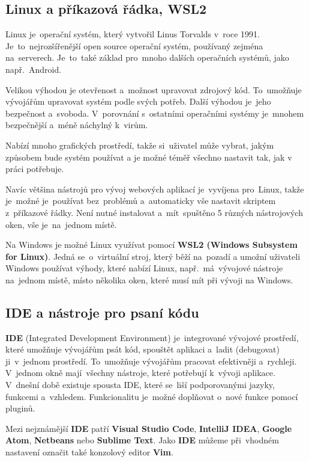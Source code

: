 \documentclass[14pt,a4paper]{article}
\begin{document}
        \subsection{Linux a příkazová řádka, WSL2}
        Linux je~operační systém, který vytvořil Linus Torvalds v~roce 1991. Je~to~nejrozšířenější open source operační systém,
        používaný zejména na~serverech. Je~to~také základ pro~mnoho dalších operačních systémů, jako např.~Android.
        
        Velikou výhodou je otevřenost a~možnost upravovat zdrojový kód. To~umožňuje vývojářům upravovat systém podle svých potřeb.
        Další výhodou je~jeho bezpečnost a~svoboda. V~porovnání s~ostatními operačními systémy je~mnohem bezpečnější a~méně náchylný k~virům.

        Nabízí mnoho grafických prostředí, takže si~uživatel může vybrat, jakým způsobem bude systém používat a je možné téměř
        všechno nastavit tak, jak v práci potřebuje.

        Navíc většina nástrojů pro vývoj webových aplikací je~vyvíjena pro~Linux, takže je~možné je~používat bez~problémů a~automaticky vše nastavit skriptem z~příkazové řádky. Není nutné instalovat a~mít~spuštěno 5 různých nástrojových oken, vše je~na~jednom místě.

        Na Windows je možné Linux využívat pomocí \textbf{WSL2 (Windows Subsystem for Linux)}. Jedná se~o~virtuální stroj, který běží na~pozadí a umožní uživateli Windows používat výhody, které nabízí Linux, např.~má~vývojové nástroje na~jednom místě, místo několika oken, které musí mít při vývoji na Windows.

        \subsection{IDE a nástroje pro psaní kódu}
        \textbf{IDE} (Integrated Development Environment) je~integrované vývojové prostředí, které umožňuje vývojářům psát kód, spouštět aplikaci a~ladit (debugovat) ji~v~jednom prostředí. To~umožňuje vývojářům pracovat efektivněji a~rychleji. V~jednom okně mají~všechny nástroje, které potřebují k~vývoji aplikace. V~dnešní době existuje spousta IDE, které se~liší podporovanými jazyky, funkcemi a~vzhledem. Funkcionalitu je~možné doplňovat o~nové funkce pomocí pluginů.
        
        Mezi nejznámější \textbf{IDE} patří \textbf{Visual Studio Code}, \textbf{IntelliJ IDEA}, \textbf{Google Atom}, \textbf{Netbeans} nebo \textbf{Sublime Text}. Jako \textbf{IDE} můžeme při~vhodném nastavení označit také konzolový editor \textbf{Vim}.
        
\end{document}
